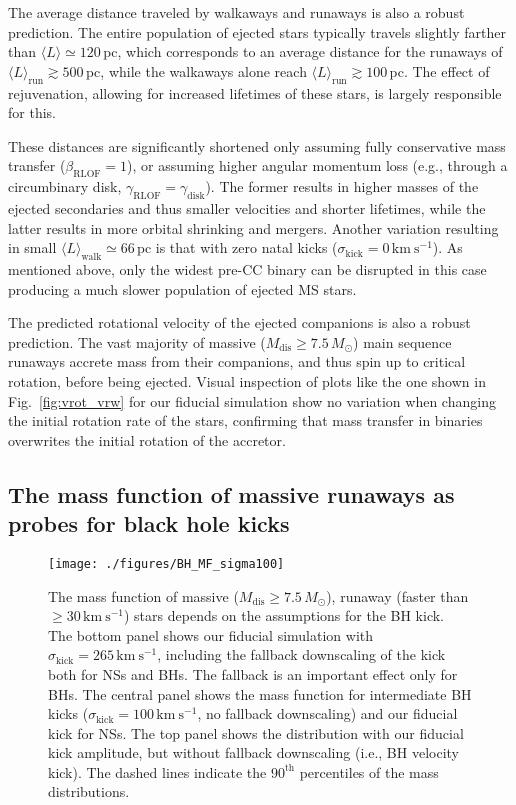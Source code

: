 \documentclass{aa}
\newcommand{\kms}{{\mathrm{km\ s^{-1}}}}
\DeclareRobustCommand{\Figref}[1]{Fig.~\ref{#1}}
\begin{document}
The average distance traveled by walkaways and runaways is also a
robust prediction. The entire population of ejected stars typically
travels slightly farther than $\langle L\rangle\simeq120$\,pc, which
corresponds to an average distance for the runaways of $\langle
L\rangle_\mathrm{run}\gtrsim500$\,pc, while the walkaways alone reach $\langle L\rangle_\mathrm{run}\gtrsim100$\,pc. The
effect of rejuvenation, allowing for increased lifetimes of
these stars, is largely responsible for this. 

These distances are
significantly shortened only assuming fully conservative mass transfer
($\beta_\mathrm{RLOF}=1$), or assuming higher angular momentum loss
(e.g., through a circumbinary disk, $\gamma_\mathrm{RLOF}=\gamma_\mathrm{disk}$). The former results in
higher masses of the ejected secondaries and thus smaller velocities
and shorter lifetimes,
while the latter results in more orbital shrinking and mergers. Another variation
resulting in small $\langle
L\rangle_\mathrm{walk}\simeq66\,\mathrm{pc}$ is that with zero natal kicks
($\sigma_\mathrm{kick}=0\,\kms$). As mentioned above, only the widest pre-CC binary can be
disrupted in this case producing a much slower population of ejected
MS stars.

The predicted rotational velocity of the ejected companions is also a
robust prediction. The vast majority of massive
($M_\mathrm{dis}\geq7.5\,M_\odot$) main sequence runaways accrete mass
from their companions, and thus spin up to critical rotation, before
being ejected. Visual inspection of plots like the one shown in
\Figref{fig:vrot_vrw} for our fiducial simulation show no variation
when changing the initial rotation rate of the stars, confirming that
mass transfer in binaries overwrites the initial rotation of the
accretor. %

\subsection{The mass function of massive runaways as probes for black hole kicks}
\label{sec:bh_kicks_mf_rw}
\begin{figure}[!bp]
  \centering
  \texttt{[image: ./figures/BH\_MF\_sigma100]}%
  \caption{The mass function of massive ($M_\mathrm{dis}\geq7.5\,M_\odot$), runaway
    (faster than $\geq30\,\mathrm{km \ s^{-1}}$) stars depends on the
    assumptions for the BH kick. The bottom panel
    shows our fiducial simulation
    with $\sigma_\mathrm{kick}=265\,\mathrm{km \ s^{-1}}$, including the fallback
    downscaling of the kick both for NSs and BHs. The fallback is an
    important effect only for BHs. The central panel
    shows the mass function for intermediate BH kicks
    ($\sigma_\mathrm{kick}=100\,\mathrm{km\ s^{-1}}$, no fallback
    downscaling) and our fiducial kick for NSs. The top panel shows
    the distribution with our fiducial kick amplitude, but without fallback downscaling (i.e., BH
    velocity kick). The dashed lines indicate the $90^\mathrm{th}$
    percentiles of the mass distributions.}
  \label{fig:bh_kicks}
\end{figure}
\end{document}
